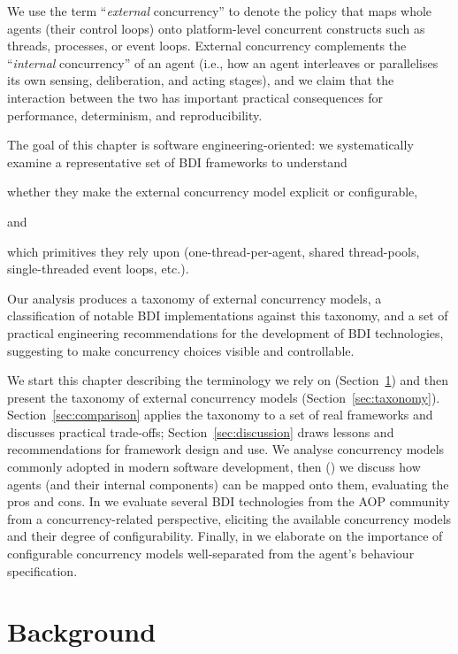We use the term ``\emph{external} concurrency'' to denote the policy 
that maps whole agents (their control loops) 
onto platform-level concurrent constructs such as 
threads, 
processes, 
or event loops. 
%
External concurrency complements the ``\emph{internal} concurrency'' of an agent 
(i.e., how an agent interleaves or parallelises its own 
sensing, 
deliberation, 
and acting stages), 
and we claim that the interaction between the two 
has important practical consequences for performance, 
determinism, 
and reproducibility.

The goal of this chapter is software engineering-oriented: 
we systematically examine a representative set of \ac{BDI} frameworks to understand
\begin{inlinelist}
    \item whether they make the external concurrency model explicit or configurable,
    \item and
    \item which primitives they rely upon (one-thread-per-agent, shared thread-pools, single-threaded event loops, etc.).
\end{inlinelist}

Our analysis produces a taxonomy of external concurrency models, 
a classification of notable \ac{BDI} implementations against this taxonomy, 
and a set of practical engineering recommendations for the development of \ac{BDI} technologies, suggesting to make concurrency choices visible and controllable.

We start this chapter describing the terminology we rely on (Section~\ref{sec:concurrency:background}) and then present the taxonomy of external concurrency models (Section~\ref{sec:taxonomy}). Section~\ref{sec:comparison} applies the taxonomy to a set of real frameworks and discusses practical trade-offs; Section~\ref{sec:discussion} draws lessons and recommendations for framework design and use.
%
We analyse concurrency models commonly adopted in modern software development,
then () we discuss how agents (and their internal components) can be mapped onto them,
evaluating the pros and cons.
%
In  we evaluate several \ac{BDI} technologies from the \ac{AOP} community from a concurrency-related perspective,
eliciting the available concurrency models and their degree of configurability.
%
Finally,
in  we elaborate on the importance of configurable concurrency models
well-separated from the agent's behaviour specification.

\section{Background}\label{sec:concurrency:background}

